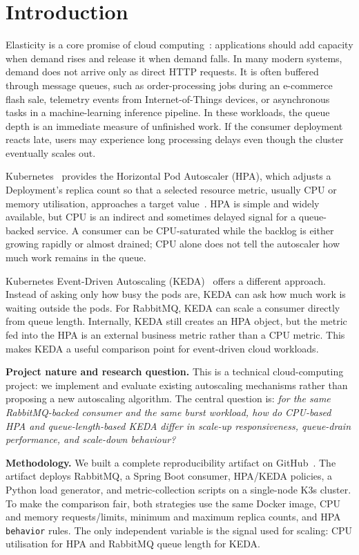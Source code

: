 \section{Introduction}
\label{sec:intro}

Elasticity is a core promise of cloud computing~\cite{mell2011nist}: applications should add capacity when demand rises and release it when demand falls. In many modern systems, demand does not arrive only as direct HTTP requests. It is often buffered through message queues, such as order-processing jobs during an e-commerce flash sale, telemetry events from Internet-of-Things devices, or asynchronous tasks in a machine-learning inference pipeline. In these workloads, the queue depth is an immediate measure of unfinished work. If the consumer deployment reacts late, users may experience long processing delays even though the cluster eventually scales out.

Kubernetes~\cite{kubernetes2024} provides the Horizontal Pod Autoscaler (HPA), which adjusts a Deployment's replica count so that a selected resource metric, usually CPU or memory utilisation, approaches a target value~\cite{kubernetes2024hpa}. HPA is simple and widely available, but CPU is an indirect and sometimes delayed signal for a queue-backed service. A consumer can be CPU-saturated while the backlog is either growing rapidly or almost drained; CPU alone does not tell the autoscaler how much work remains in the queue.

Kubernetes Event-Driven Autoscaling (KEDA)~\cite{keda2024} offers a different approach. Instead of asking only how busy the pods are, KEDA can ask how much work is waiting outside the pods. For RabbitMQ, KEDA can scale a consumer directly from queue length. Internally, KEDA still creates an HPA object, but the metric fed into the HPA is an external business metric rather than a CPU metric. This makes KEDA a useful comparison point for event-driven cloud workloads.

\textbf{Project nature and research question.} This is a technical cloud-computing project: we implement and evaluate existing autoscaling mechanisms rather than proposing a new autoscaling algorithm. The central question is: \emph{for the same RabbitMQ-backed consumer and the same burst workload, how do CPU-based HPA and queue-length-based KEDA differ in scale-up responsiveness, queue-drain performance, and scale-down behaviour?}

\textbf{Methodology.} We built a complete reproducibility artifact on GitHub~\cite{group5artifact2026}. The artifact deploys RabbitMQ, a Spring Boot consumer, HPA/KEDA policies, a Python load generator, and metric-collection scripts on a single-node K3s cluster. To make the comparison fair, both strategies use the same Docker image, CPU and memory requests/limits, minimum and maximum replica counts, and HPA \texttt{behavior} rules. The only independent variable is the signal used for scaling: CPU utilisation for HPA and RabbitMQ queue length for KEDA.

